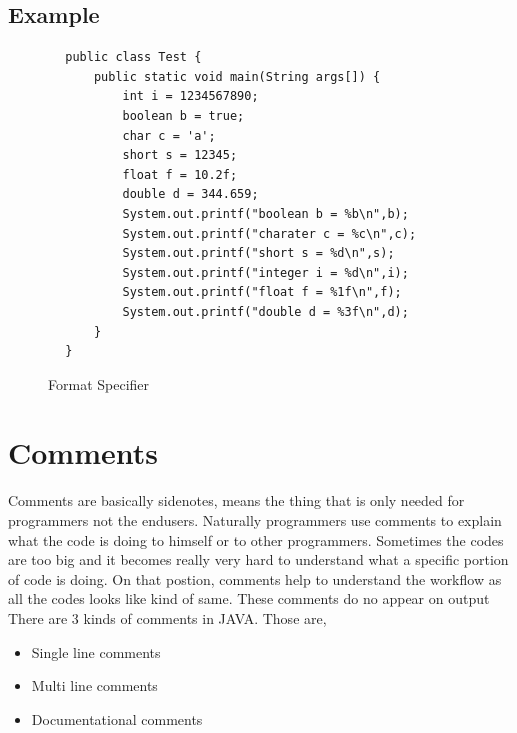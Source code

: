 \documentclass[A4 paper,openany]{book}  %
\begin{document}
\subsection{Example}
\begin{center}
    \begin{verbatim}
        public class Test {
            public static void main(String args[]) {
                int i = 1234567890;
                boolean b = true;
                char c = 'a';
                short s = 12345;
                float f = 10.2f;
                double d = 344.659;
                System.out.printf("boolean b = %b\n",b);
                System.out.printf("charater c = %c\n",c);
                System.out.printf("short s = %d\n",s);
                System.out.printf("integer i = %d\n",i);
                System.out.printf("float f = %1f\n",f);
                System.out.printf("double d = %3f\n",d);
            }
        }
    \end{verbatim}
\end{center}
% 
% 
\begin{figure}[htbp]
    \begin{center}
        \caption{Format Specifier\cite{Ref5}\cite{Ref3}}
    \end{center}
\end{figure}
% 
%
\section{Comments}
Comments are basically sidenotes, means the thing that is only needed for programmers not the endusers. Naturally  programmers use comments to explain what the code is doing to himself
or to other programmers. Sometimes the codes are too big and it becomes really very hard to understand what a specific portion of code is doing. On that postion, comments help to understand
the workflow as all the codes looks like kind of same. These comments do no appear on output There are 3 kinds of comments in JAVA. Those are,
\begin{itemize}
    \item Single line comments
    \item Multi line comments
    \item Documentational comments
\end{itemize}
% 
%
\end{document}
